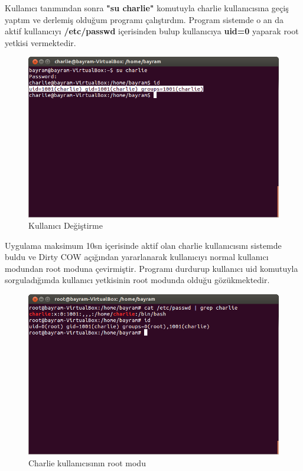 \documentclass[conference, 12pt, a4paper]{IEEEtran}
\begin{document}
\begin{sloppypar}
    Kullanıcı tanımından sonra \textbf{"su charlie"} komutuyla charlie kullanıcısına geçiş yaptım ve derlemiş olduğum programı çalıştırdım. Program sistemde o an da aktif kullanıcıyı \textbf{/etc/passwd} içerisinden bulup kullanıcıya \textbf{uid=0} yaparak root yetkisi vermektedir. 
    \begin{figure}[htbp]
        \centering
        \includegraphics[scale=0.28]{change-user-charlie.png}
        \caption{Kullanıcı Değiştirme}
    \end{figure}
    Uygulama maksimum 10sn içerisinde aktif olan charlie kullanıcısını sistemde buldu ve Dirty COW açığından yararlanarak kullanıcıyı normal kullanıcı modundan root moduna çevirmiştir. Programı durdurup kullanıcı uid komutuyla sorguladığımda kullanıcı yetkisinin root modunda olduğu gözükmektedir.
    \begin{figure}[htbp]
        \centering
        \includegraphics[scale=0.28]{root-charlie.png}
        \caption{Charlie kullanıcısının root modu}
    \end{figure}


\end{sloppypar}
\end{document}
